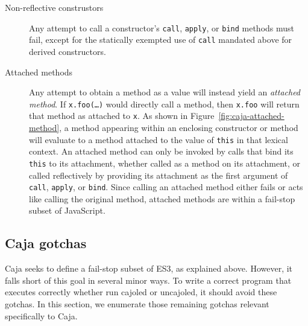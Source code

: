 \documentclass[letterpaper,twocolumn,10pt]{article}
\newcommand{\code}[1]{{\tt {#1}}}              %
\begin{document}
\begin{description}
   \item[Non-reflective construstors] Any attempt to call a constructor's 
   \code{call}, \code{apply}, or \code{bind} methods must fail, except for 
   the statically exempted use of \code{call} mandated above for derived 
   constructors.
   
   \item[Attached methods] Any attempt to obtain a method as a value will 
   instead yield an \emph{attached method}. If \code{x.foo(\ldots)} would 
   directly call a method, then \code{x.foo} will return that method as 
   attached to \code{x}. As shown in Figure~\ref{fig:caja-attached-method}, a 
   method appearing within an enclosing constructor or method will evaluate 
   to a method attached to the value of \code{this} in that lexical context. 
   An attached method can only be invoked by calls that bind its \code{this} 
   to its attachment, whether called as a method on its attachment, or called 
   reflectively by providing its attachment as the first argument of 
   \code{call}, \code{apply}, or \code{bind}. Since calling an attached 
   method either fails or acts like calling the original method, attached 
   methods are within a fail-stop subset of JavaScript.
  
\end{description}


\subsection{Caja gotchas}

Caja seeks to define a fail-stop subset of ES3, as explained above. However, 
it falls short of this goal in several minor ways. To write a correct program 
that executes correctly whether run cajoled or uncajoled, it should 
avoid these gotchas. In this section, we enumerate those remaining gotchas
relevant specifically to Caja.
\end{document}
